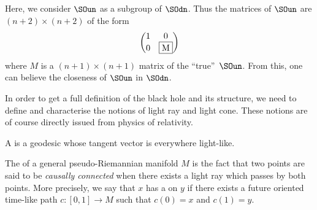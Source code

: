 \begin{remark}
	Here, we consider $\SOun$ as a subgroup of $\SOdn$. Thus the matrices of $\SOun$ are $(n+2)\times (n+2)$ of the form
	\[
		\begin{pmatrix}
			1 & 0        \\
			0 & \fbox{M}
		\end{pmatrix}
	\]
	where $M$ is a $(n+1)\times (n+1)$ matrix of the ``true''\ $\SOun$. From this, one can believe the closeness of $\SOun$ in $\SOdn$.
\end{remark}

In order to get a full definition of the black hole and its structure, we need to define and characterise the notions of light ray and light cone. These notions are of course directly issued from physics of relativity.
\begin{definition}
	A  is a geodesic whose tangent vector is everywhere light-like.
	\label{lightraycone}
\end{definition}

The  of a general pseudo-Riemannian manifold $M$ is the fact that two points are said to be \emph{causally connected} when there exists a light ray which passes by both points. More precisely, we say that $x$ has a  on $y$ if there exists a future oriented time-like path $c\colon [0,1]\to M$ such that $c(0)=x$ and $c(1)=y$.

